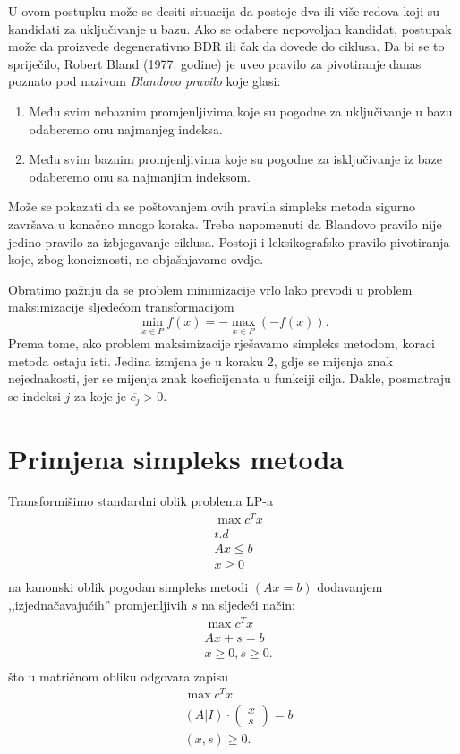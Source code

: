 \documentclass[b5paper, utf8, 11pt, colorlinks]{book}
\theoremstyle{definition}
\begin{document}
 U ovom postupku  može se desiti situacija da postoje dva ili više redova koji su kandidati za uključivanje u bazu. Ako se odabere nepovoljan kandidat, postupak može da proizvede degenerativno BDR ili čak da dovede do ciklusa. 
 Da bi se to spriječilo, Robert Bland (1977. godine) je uveo pravilo za pivotiranje danas poznato pod
 nazivom \emph{Blandovo pravilo} koje glasi:
 \begin{enumerate}
 	\item   Među svim nebaznim promjenljivima koje su pogodne za uključivanje u bazu odaberemo onu najmanjeg indeksa. 
 	\item Među svim baznim promjenljivima koje su pogodne za isključivanje iz baze odaberemo onu sa najmanjim indeksom.
 \end{enumerate}
 Može se pokazati da se poštovanjem ovih pravila   simpleks metoda sigurno završava u konačno mnogo koraka. Treba napomenuti da Blandovo pravilo nije jedino pravilo za izbjegavanje ciklusa. Postoji i leksikografsko pravilo pivotiranja koje, zbog konciznosti, ne objašnjavamo ovdje.  

 Obratimo pažnju da se problem minimizacije vrlo lako prevodi u problem maksimizacije sljedećom transformacijom
 $$ \min_{ x \in P} f(x) = - \max_{x \in P}(-f(x)).$$ 
 Prema tome, ako  problem maksimizacije rješavamo simpleks metodom, koraci metoda ostaju isti. Jedina izmjena je u koraku 2, gdje se mijenja znak nejednakosti, jer se mijenja znak koeficijenata u funkciji cilja.  Dakle, posmatraju se indeksi $j$ za koje je $\overline{c_j} > 0$.

\section{Primjena simpleks metoda}
 Transformišimo standardni oblik problema LP-a
\begin{align*}
 	& \max c^T x  \\
 	& {t.d} \nonumber \\
 	& Ax \leq b \\
 	& x \geq 0\\
 \end{align*}
 na kanonski oblik pogodan simpleks metodi $(A {x} = b)$ dodavanjem ,,izjednačavajućih'' promjenljivih $s$ na sljedeći način:
 \begin{align}
 	&  \max  c^T x   \\
 	& Ax + s =  b \\
 	& x \geq 0, s \geq 0. \\
  \end{align}
  što u matričnom obliku odgovara zapisu
 \begin{align}
 	& \max c^T x  \\
 	& (A | I) \cdot \left (\begin{array}{c}
  		x  \\
 		s 
 	\end{array} \right ) =  b \\
 	& (x, s) \geq 0. \\
 \end{align} 
\end{document}

